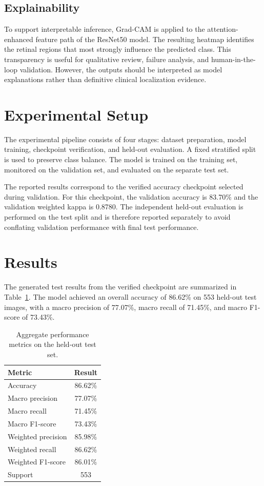 \documentclass[conference]{IEEEtran}
\begin{document}
\subsection{Explainability}
To support interpretable inference, Grad-CAM is applied to the attention-enhanced feature path of the ResNet50 model. The resulting heatmap identifies the retinal regions that most strongly influence the predicted class. This transparency is useful for qualitative review, failure analysis, and human-in-the-loop validation. However, the outputs should be interpreted as model explanations rather than definitive clinical localization evidence.

\section{Experimental Setup}
The experimental pipeline consists of four stages: dataset preparation, model training, checkpoint verification, and held-out evaluation. A fixed stratified split is used to preserve class balance. The model is trained on the training set, monitored on the validation set, and evaluated on the separate test set.

The reported results correspond to the verified accuracy checkpoint selected during validation. For this checkpoint, the validation accuracy is 83.70\% and the validation weighted kappa is 0.8780. The independent held-out evaluation is performed on the test split and is therefore reported separately to avoid conflating validation performance with final test performance.

\section{Results}
The generated test results from the verified checkpoint are summarized in Table~\ref{tab:aggregate}. The model achieved an overall accuracy of 86.62\% on 553 held-out test images, with a macro precision of 77.07\%, macro recall of 71.45\%, and macro F1-score of 73.43\%.

\begin{table}[t]
\centering
\caption{Aggregate performance metrics on the held-out test set.}
\label{tab:aggregate}
\begin{tabular}{lc}
\toprule
Metric & Result \\
\midrule
Accuracy & 86.62\% \\
Macro precision & 77.07\% \\
Macro recall & 71.45\% \\
Macro F1-score & 73.43\% \\
Weighted precision & 85.98\% \\
Weighted recall & 86.62\% \\
Weighted F1-score & 86.01\% \\
Support & 553 \\
\bottomrule
\end{tabular}
\end{table}
\end{document}
